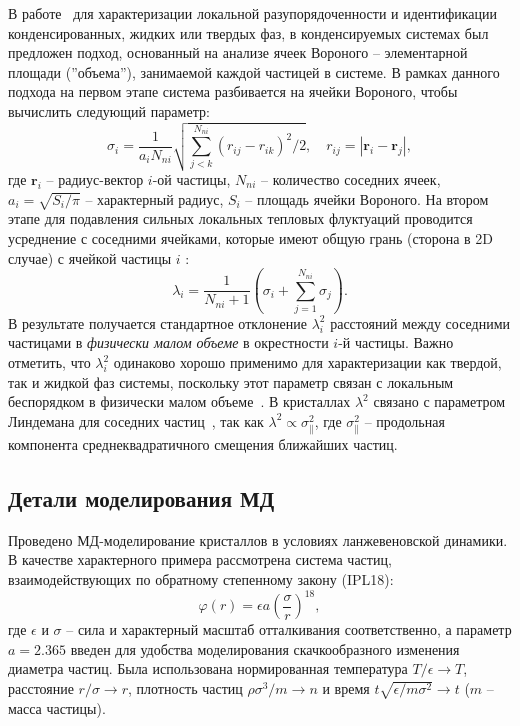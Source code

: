 В работе~\cite{10.1021/acs.jpcc.7b09317} для характеризации локальной разупорядоченности и идентификации конденсированных, жидких или твердых фаз, в конденсируемых системах был предложен подход, основанный на анализе ячеек Вороного -- элементарной площади (''объема''), занимаемой каждой частицей в системе.
В рамках данного подхода на первом этапе система разбивается на ячейки Вороного, чтобы вычислить следующий параметр:
\begin{equation}
  \label{SSMF-eq1}
  \sigma_{i} =\frac{1}{a_i N_{ni}}\sqrt{\sum_{j<k}^{N_{ni}}{(r_{ij}-r_{ik})^2}/2}, \quad r_{ij}=|\mathbf{r}_i-\mathbf{r}_j|,
\end{equation}
где $\mathbf{r}_i$ -- радиус-вектор $i$-ой частицы, $N_{ni}$ -- количество соседних ячеек, $a_i = \sqrt{S_i/\pi}$ -- характерный радиус, $S_i$ -- площадь ячейки Вороного.
На втором этапе для подавления сильных локальных тепловых флуктуаций проводится усреднение с соседними ячейками, которые имеют общую грань (сторона в 2D случае) с ячейкой частицы $i$ \cite{10.1021/acs.jpcc.7b09317}:
\begin{equation}
  \label{SSMF-eq2}
  \lambda_{i} = \frac{1}{N_{ni}+1}\left(\sigma_{i}+\sum_{j=1}^{N_{ni}}{\sigma_{j}}\right).
\end{equation}
В результате получается стандартное отклонение $\lambda_i^2$ расстояний между соседними частицами в \emph{физически малом объеме} в окрестности $i$-й частицы.
Важно отметить, что $\lambda_i^2$ одинаково хорошо применимо для характеризации как твердой, так и жидкой фаз системы, поскольку этот параметр связан с локальным беспорядком в физически малом объеме~\cite{10.1021/acs.jpcc.7b09317}.
В кристаллах $\lambda^2$ связано с параметром Линдемана для соседних частиц~\cite{10.1016/0375-9601(85)90617-6}, так как $\lambda^2 \propto \sigma_\|^2$, где $\sigma_\|^2$ -- продольная компонента среднеквадратичного смещения ближайших частиц.


\subsection{Детали моделирования МД}
\label{SSMF-AppC}

Проведено МД-моделирование кристаллов в условиях ланжевеновской динамики.
В качестве характерного примера рассмотрена система частиц, взаимодействующих по обратному степенному закону (IPL18):
\begin{equation}
  \label{SSMF-eq3}
  \varphi(r) = \epsilon a \left(\frac{\sigma}{r}\right)^{18},
\end{equation}
где $\epsilon$ и $\sigma$ -- сила и характерный масштаб отталкивания соответственно,
а параметр $ a = 2.365 $ введен для удобства моделирования скачкообразного изменения диаметра частиц.
Была использована нормированная температура $ T/ \epsilon \rightarrow T $, расстояние $ r/ \sigma \rightarrow r $, плотность частиц $\rho\sigma^3/m\rightarrow n$ и время $t\sqrt{\epsilon/m\sigma^2} \rightarrow t$ ($m$ -- масса частицы).

